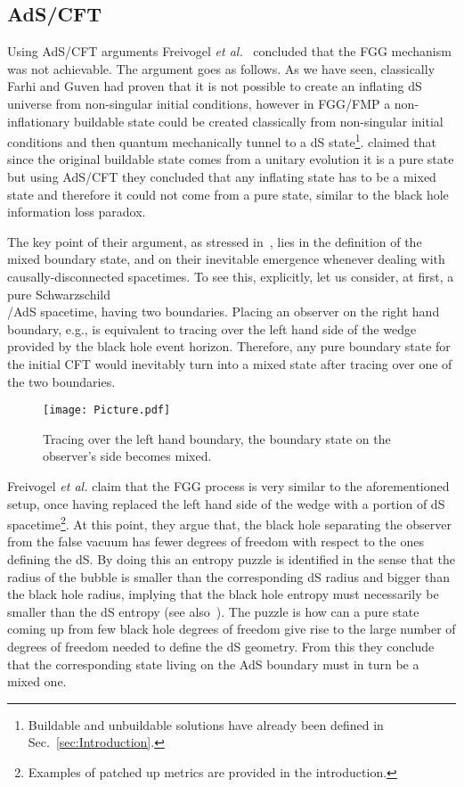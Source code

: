 \documentclass[11pt,a4paper]{article}
\begin{document}
\subsection{AdS/CFT}

Using AdS/CFT arguments Freivogel {\it et al.}~\cite{Freivogel:2005qh} concluded that the FGG mechanism was not achievable. The argument goes as follows. As we have seen, classically Farhi and Guven had proven that it is not possible to create an inflating dS universe from non-singular initial conditions, however in FGG/FMP a non-inflationary buildable state could be created classically from non-singular initial conditions and then quantum mechanically tunnel to a dS state\footnote{Buildable and unbuildable solutions have already been defined in Sec.~\ref{sec:Introduction}.}. \cite{Freivogel:2005qh} claimed that since the original buildable state comes from a unitary evolution it is a pure state but using AdS/CFT they concluded that any inflating state has to be a mixed state and therefore it could not come from a pure state, similar to the black hole information loss paradox.  

The key point of their argument, as stressed in~\cite{Freivogel:2005qh}, lies in the definition of the mixed boundary state, and on their inevitable emergence whenever dealing with causally-disconnected spacetimes. To see this, explicitly, let us consider, at first, a pure Schwarzschild\\/AdS spacetime, having two boundaries. Placing an observer on the right hand boundary, e.g., is equivalent to tracing over the left hand side of the wedge provided by the black hole event horizon. Therefore, any pure boundary state for the initial CFT would inevitably turn into a mixed state after tracing over one of the two boundaries. 

\begin{figure}[h!]  
\begin{center} 
\texttt{[image: Picture.pdf]} 
\caption{\footnotesize{Tracing over the left hand boundary, the boundary state on the observer's side becomes mixed.}} 
\end{center} 
\end{figure} 

Freivogel \emph{et al.} claim that the FGG process is very similar to the aforementioned setup, once having replaced the left hand side of the wedge with a portion of dS spacetime\footnote{Examples of patched up metrics are provided in the introduction.}. At this point, they argue that, the black hole separating the observer from the false vacuum has fewer degrees of freedom with respect to the ones defining the dS. By doing this an entropy puzzle is identified in the sense that the radius of the bubble is smaller than the corresponding dS radius and bigger than the black hole radius, implying that the black hole entropy must necessarily be smaller than the dS entropy (see also~\cite{Banks:2002nm}). The puzzle is how can a pure state coming up from few black hole degrees of freedom give rise to the large number of degrees of freedom needed to define the dS geometry. From this they conclude that the corresponding state living on the AdS boundary must in turn be a mixed one. 
\end{document}
